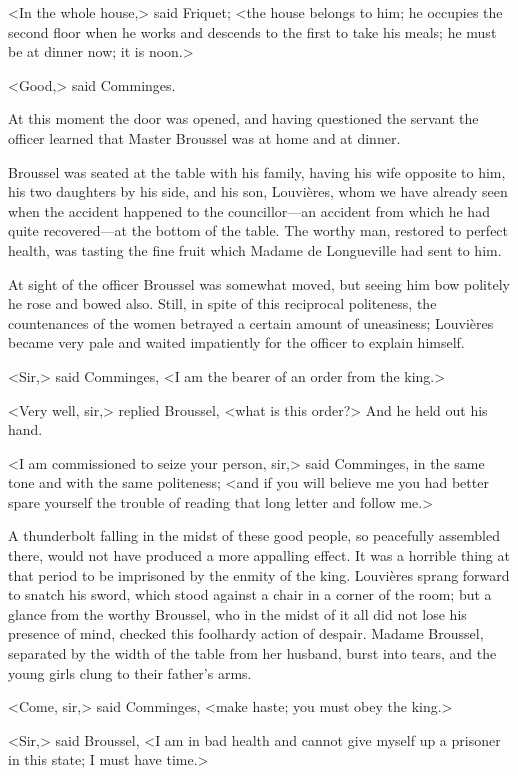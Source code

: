 <In the whole house,> said Friquet; <the house belongs to him; he occupies the second floor when he works and descends to the first to take his meals; he must be at dinner now; it is noon.>

<Good,> said Comminges.

At this moment the door was opened, and having questioned the servant the officer learned that Master Broussel was at home and at dinner.

Broussel was seated at the table with his family, having his wife opposite to him, his two daughters by his side, and his son, Louvières, whom we have already seen when the accident happened to the councillor—an accident from which he had quite recovered—at the bottom of the table. The worthy man, restored to perfect health, was tasting the fine fruit which Madame de Longueville had sent to him.

At sight of the officer Broussel was somewhat moved, but seeing him bow politely he rose and bowed also. Still, in spite of this reciprocal politeness, the countenances of the women betrayed a certain amount of uneasiness; Louvières became very pale and waited impatiently for the officer to explain himself.

<Sir,> said Comminges, <I am the bearer of an order from the king.>

<Very well, sir,> replied Broussel, <what is this order?> And he held out his hand.

<I am commissioned to seize your person, sir,> said Comminges, in the same tone and with the same politeness; <and if you will believe me you had better spare yourself the trouble of reading that long letter and follow me.>

A thunderbolt falling in the midst of these good people, so peacefully assembled there, would not have produced a more appalling effect. It was a horrible thing at that period to be imprisoned by the enmity of the king. Louvières sprang forward to snatch his sword, which stood against a chair in a corner of the room; but a glance from the worthy Broussel, who in the midst of it all did not lose his presence of mind, checked this foolhardy action of despair. Madame Broussel, separated by the width of the table from her husband, burst into tears, and the young girls clung to their father's arms.

<Come, sir,> said Comminges, <make haste; you must obey the king.>

<Sir,> said Broussel, <I am in bad health and cannot give myself up a prisoner in this state; I must have time.>

